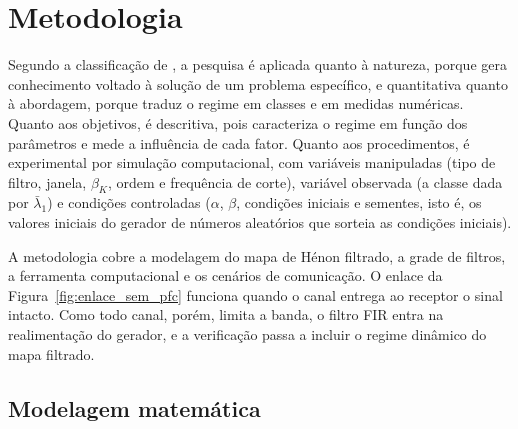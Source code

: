 \documentclass{pfccefsa}
\begin{document}
\section{Metodologia}
\label{sec:metodologia}

Segundo a classificação de \textcite{Prodanov2013}, a pesquisa é aplicada
quanto à natureza, porque gera conhecimento voltado à solução de um problema
específico, e quantitativa quanto à abordagem, porque traduz o regime em classes
e em medidas numéricas. Quanto aos objetivos, é descritiva, pois caracteriza o
regime em função dos parâmetros e mede a influência de cada fator. Quanto aos
procedimentos, é experimental por simulação computacional, com variáveis
manipuladas (tipo de filtro, janela, $\beta_K$, ordem e frequência de corte),
variável observada (a classe dada por $\bar\lambda_1$) e condições controladas
($\alpha$, $\beta$, condições iniciais e sementes, isto é, os valores iniciais
do gerador de números aleatórios que sorteia as condições iniciais).

A metodologia cobre a modelagem do mapa de Hénon filtrado, a grade de filtros,
a ferramenta computacional e os cenários de comunicação. O enlace da
Figura~\ref{fig:enlace_sem_pfc} funciona quando o canal entrega ao receptor o
sinal intacto. Como todo canal, porém, limita a banda, o filtro FIR entra na
realimentação do gerador, e a verificação passa a incluir o regime dinâmico do
mapa filtrado.

\subsection{Modelagem matemática}
\label{sub:modelagem}
\end{document}
